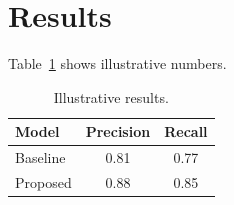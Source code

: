 \section{Results}
\label{sec:results}

Table~\ref{tab:results} shows illustrative numbers.

\begin{table}[ht]
  \centering
  \caption{Illustrative results.}
  \label{tab:results}
  \begin{tabular}{lcc}
    \toprule
    Model & Precision & Recall \\
    \midrule
    Baseline & 0.81 & 0.77 \\
    Proposed & 0.88 & 0.85 \\
    \bottomrule
  \end{tabular}
\end{table}
